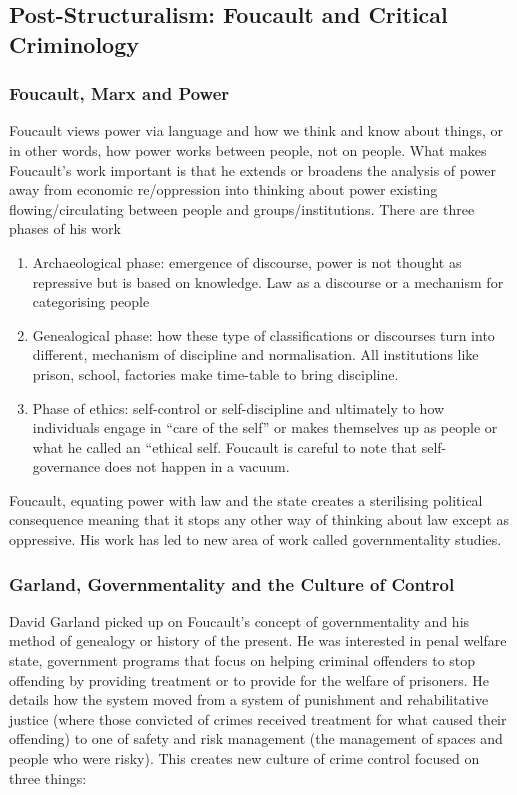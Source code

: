 \documentclass{article}
\begin{document}
\subsection{Post-Structuralism: Foucault and Critical Criminology}

\subsubsection*{Foucault, Marx and Power}

Foucault views power via language and how we think and know about things, or in other words, how power works between people, not on people. What makes Foucault’s work important is that he extends or broadens the analysis of power away from economic re/oppression into thinking about power existing flowing/circulating between people and groups/institutions. There are three phases of his work

\begin{enumerate}
    \item Archaeological phase: emergence of discourse, power is not thought as repressive but is based on knowledge. Law as a discourse or a mechanism for categorising people
    \item Genealogical phase: how these type of classifications or discourses turn into different, mechanism of discipline and normalisation. All institutions like prison, school, factories make time-table to bring discipline.
    \item Phase of ethics: self-control or self-discipline and ultimately to how individuals engage in “care of the self” or makes themselves up as people or what he called an “ethical self. Foucault is careful to note that self-governance does not happen in a vacuum.
\end{enumerate}

Foucault, equating power with law and the state creates a sterilising political consequence meaning that it stops any other way of thinking about law except as oppressive. His work has led to new area of work called governmentality studies.

\subsubsection*{Garland, Governmentality and the Culture of Control}

David Garland picked up on Foucault’s concept of governmentality and his method of genealogy or history of the present. He was interested in penal welfare state, government programs that focus on helping criminal offenders to stop offending by providing treatment or to provide for the welfare of prisoners. He details how the system moved from a system of punishment and rehabilitative justice (where those convicted of crimes received treatment for what caused their offending) to one of safety and risk management (the management of spaces and people who were risky). This creates new culture of crime control focused on three things:
\end{document}
